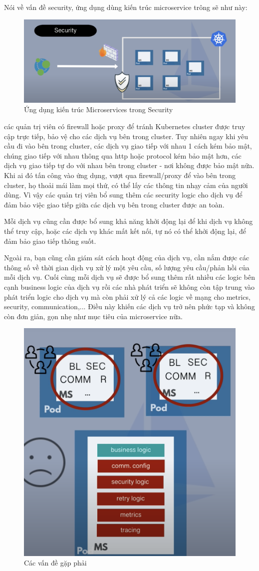 \documentclass[12pt,a4paper]{report}
\begin{document}
		\newpage Nói về vấn đề security, ứng dụng dùng kiến trúc microservice trông sẽ như này:
		\begin{figure}[h]
			\centering
			\includegraphics[width=0.7\linewidth]{Pics/2.1.1-p1}
			\caption{Ứng dụng kiến trúc Microservices trong Security}
			\label{fig:2.1.1-1}
		\end{figure}
		
		các quản trị viên có firewall hoặc proxy để tránh Kubernetes cluster được truy cập trực tiếp, bảo vệ cho các dịch vụ bên trong cluster. Tuy nhiên ngay khi yêu cầu đi vào bên trong cluster, các dịch vụ giao tiếp với nhau 1 cách kém bảo mật, chúng giao tiếp với nhau thông qua http hoặc protocol kém bảo mật hơn, các dịch vụ giao tiếp tự do với nhau bên trong cluster - nơi không được bảo mật nữa. Khi ai đó tấn công vào ứng dụng, vượt qua firewall/proxy để vào bên trong cluster, họ thoải mái làm mọi thứ, có thể lấy các thông tin nhạy cảm của người dùng. Vì vậy các quản trị viên bổ sung thêm các security logic cho dịch vụ để đảm bảo việc giao tiếp giữa các dịch vụ bên trong cluster được an toàn.
		
		Mỗi dịch vụ cũng cần được bổ sung khả năng khởi động lại để khi dịch vụ không thể truy cập, hoặc các dịch vụ khác mất kết nối, tự nó có thể khởi động lại, để đảm bảo giao tiếp thông suốt.
		
		Ngoài ra, bạn cũng cần giám sát cách hoạt động của dịch vụ, cần nắm được các thông số về thời gian dịch vụ xử lý một yêu cầu, số lượng yêu cầu/phản hồi của mỗi dịch vụ. Cuối cùng mỗi dịch vụ sẽ được bổ sung thêm rất nhiều các logic bên cạnh business logic của dịch vụ rồi các nhà phát triển sẽ không còn tập trung vào phát triển logic cho dịch vụ mà còn phải xử lý cả các logic về mạng cho metrics, security, communication,... Điều này khiến các dịch vụ trở nên phức tạp và không còn đơn giản, gọn nhẹ như mục tiêu của microservice nữa.
		\begin{figure}[h]
			\centering
			\includegraphics[width=0.48\linewidth]{Pics/2.1.1-p2}
			\caption{Các vấn đề gặp phải}
			\label{fig:2.1.1-2}
		\end{figure}
		
\end{document}
